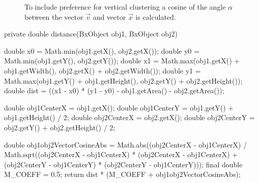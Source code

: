 \begin{figure}[h!]
  \centering
  
  \caption{To include preference for vertical clustering a cosine of the angle $\alpha$ between the vector $\vec{v}$ and vector $\vec{x}$ is calculated.}
  \label{fig:angle_alpha}
\end{figure}
\begin{code}[caption=Listing of the function measuring distance between two zones or zone groups.]

private double distance(BxObject obj1, BxObject obj2) {

    double x0 = Math.min(obj1.getX(), obj2.getX());
    double y0 = Math.min(obj1.getY(), obj2.getY());
    double x1 = Math.max(obj1.getX() + obj1.getWidth(),
            obj2.getX() + obj2.getWidth());
    double y1 = Math.max(obj1.getY() + obj1.getHeight(),
            obj2.getY() + obj2.getHeight());
    double dist = ((x1 - x0) * (y1 - y0) - obj1.getArea() - obj2.getArea());

    double obj1CenterX = obj1.getX();
    double obj1CenterY = obj1.getY() + obj1.getHeight() / 2;
    double obj2CenterX = obj2.getX();
    double obj2CenterY = obj2.getY() + obj2.getHeight() / 2;

    double obj1obj2VectorCosineAbs = Math.abs((obj2CenterX - obj1CenterX) / Math.sqrt((obj2CenterX - obj1CenterX) * (obj2CenterX - obj1CenterX) + (obj2CenterY - obj1CenterY) * (obj2CenterY - obj1CenterY)));
    final double M_COEFF = 0.5;
    return dist * (M_COEFF + obj1obj2VectorCosineAbs);
}
\end{code}
